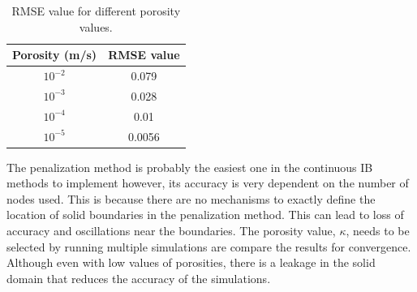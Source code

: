 \begin{table}[H]
\centering
\begin{tabular}{c | c}
	Porosity (m/s) & RMSE value \\ \hline \hline
	$10^{-2}$ & 0.079 \\ \hline
	$10^{-3}$ & 0.028 \\ \hline
	$10^{-4}$ & 0.01 \\ \hline
	$10^{-5}$ & 0.0056
\end{tabular}
\caption{RMSE value for different porosity values.}
\label{table:C3_penalizationResultPorosityRMSE}
\end{table}

The penalization method is probably the easiest one in the continuous IB methods to implement however, its accuracy is very dependent on the number of nodes used. This is because there are no mechanisms to exactly define the location of solid boundaries in the penalization method. This can lead to loss of accuracy and oscillations near the boundaries. The porosity value, $\kappa$, needs to be selected by running multiple simulations are compare the results for convergence. Although even with low values of porosities, there is a leakage in the solid domain that reduces the accuracy of the simulations.

